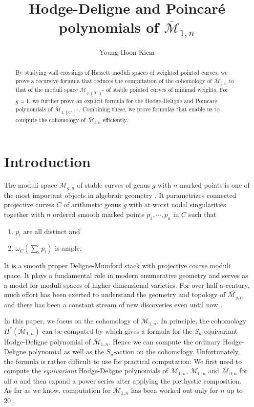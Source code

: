 \documentclass[11pt]{amsart}
\title{Hodge-Deligne and Poincar\'e polynomials of $\overline{\mathcal M}_{1,n}$} %
\author{Young-Hoon Kiem}
\date{}
\numberwithin{equation}{section}
\theoremstyle{definition}
\def\cM{{\mathcal M}}
\def\bcM{\overline{\cM}}
\begin{document}
\begin{abstract}
    By studying wall crossings of Hassett moduli spaces of weighted pointed curves, we prove a recursive formula that reduces the computation of the cohomology of $\bcM_{g,n}$ to that of the moduli space $\bcM_{g,(0^+)^n}$ of stable pointed curves of minimal weights. For $g=1$, we further prove an explicit formula for the Hodge-Deligne and Poincar\'e polynomials of $\bcM_{1,(0^+)^n}$. Combining these, we prove formulas that enable us to compute the cohomology of $\bcM_{1,n}$ efficiently.  
\end{abstract}

\maketitle


\section{Introduction}

The moduli space $\bcM_{g,n}$ of stable curves of genus $g$ with $n$ marked points is one of the most important objects in algebraic geometry \cite{DM, Knu}. It parametrizes connected projective curves $C$ of arithmetic genus $g$ with at worst nodal singularities together with $n$ ordered smooth marked points $p_1,\cdots, p_n$ in $C$ such that 
\begin{enumerate}
\item $p_i$ are all distinct and 
\item $\omega_C(\sum_i p_i)$ is ample. 
\end{enumerate}
It is a smooth proper Deligne-Mumford stack with projective coarse moduli space. It plays a fundamental role in modern enumerative geometry and serves as a model for moduli spaces of higher dimensional varieties. 
For over half a century, much effort has been exerted to understand the geometry and topology of $\bcM_{g,n}$ and there has been a constant stream of new discoveries even until now \cite{BK,BKs,CK,CKL1,CKL2,CKL3,KSY}. 

In this paper, we focus on the cohomology of $\bcM_{1,n}$. 
In principle, the cohomology $H^*(\bcM_{1,n})$ can be computed by \cite{Getzler2} which gives a formula for the $S_n$-equivariant Hodge-Deligne polynomial of $\bcM_{1,n}$. Hence we can compute the ordinary Hodge-Deligne polynomial as well as the $S_n$-action on the cohomology. 
Unfortunately, the formula is rather difficult to use for practical computation: We first need to compute the \emph{equivariant} Hodge-Deligne polynomials of $\cM_{1,n}$, $\cM_{0,n}$ and $\bcM_{0,n}$ for all $n$ and  then expand a power series after applying the plethystic composition. As far as we know, computation for $\bcM_{1,n}$ has been worked out only for $n$ up to 20 \cite{BeT}. 
\end{document}
